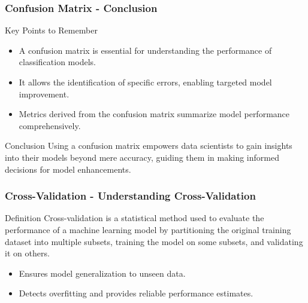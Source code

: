 \documentclass[aspectratio=169]{beamer}
\begin{document}
\begin{frame}[fragile]
    \frametitle{Confusion Matrix - Conclusion}
    \begin{block}{Key Points to Remember}
        \begin{itemize}
            \item A confusion matrix is essential for understanding the performance of classification models.
            \item It allows the identification of specific errors, enabling targeted model improvement.
            \item Metrics derived from the confusion matrix summarize model performance comprehensively.
        \end{itemize}
    \end{block}
    \begin{block}{Conclusion}
        Using a confusion matrix empowers data scientists to gain insights into their models beyond mere accuracy, guiding them in making informed decisions for model enhancements.
    \end{block}
\end{frame}

\begin{frame}[fragile]
    \frametitle{Cross-Validation - Understanding Cross-Validation}
    
    \begin{block}{Definition}
        Cross-validation is a statistical method used to evaluate the performance of a machine learning model by partitioning the original training dataset into multiple subsets, training the model on some subsets, and validating it on others.
    \end{block}
    
    \begin{itemize}
        \item Ensures model generalization to unseen data.
        \item Detects overfitting and provides reliable performance estimates.
    \end{itemize}
\end{frame}
\end{document}
